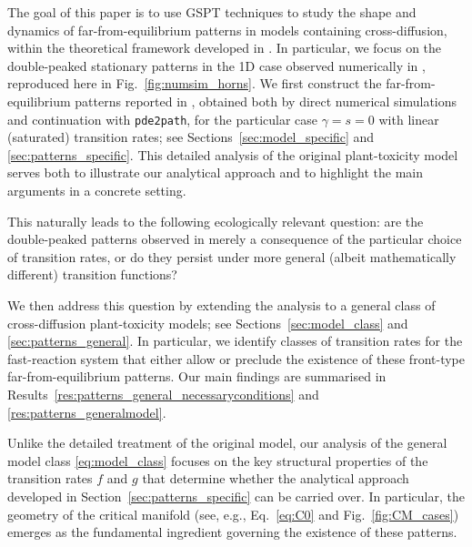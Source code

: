 \documentclass[a4paper,10pt,abstract=true,parskip=true]{scrartcl}
\theoremstyle{remark}
\numberwithin{equation}{section}
\numberwithin{thm}{section}
\begin{document}
The goal of this paper is to use GSPT techniques to study the shape and dynamics of far-from-equilibrium patterns in models containing cross-diffusion, within the theoretical framework developed in \cite{DoelmanVeerman.2015}. In particular, we focus on the double-peaked stationary patterns in the 1D case observed numerically in \cite{GIS_2026}, reproduced here in Fig.~\ref{fig:numsim_horns}. We first construct the far-from-equilibrium patterns reported in \cite{GIS_2026}, obtained both by direct numerical simulations and continuation with \texttt{pde2path}, for the particular case $\gamma=s=0$ with linear (saturated) transition rates; see Sections~\ref{sec:model_specific} and \ref{sec:patterns_specific}. This detailed analysis of the original plant-toxicity model serves both to illustrate our analytical approach and to highlight the main arguments in a concrete setting.

This naturally leads to the following ecologically relevant question: are the double-peaked patterns observed in \cite{GIS_2026} merely a consequence of the particular choice of transition rates, or do they persist under more general (albeit mathematically different) transition functions?

We then address this question by extending the analysis to a general class of cross-diffusion plant-toxicity models; see Sections~\ref{sec:model_class} and \ref{sec:patterns_general}. In particular, we identify classes of transition rates for the fast-reaction system that either allow or preclude the existence of these front-type far-from-equilibrium patterns. Our main findings are summarised in Results~\ref{res:patterns_general_necessaryconditions} and \ref{res:patterns_generalmodel}.

Unlike the detailed treatment of the original model, our analysis of the general model class \eqref{eq:model_class} focuses on the key structural properties of the transition rates $f$ and $g$ that determine whether the analytical approach developed in Section~\ref{sec:patterns_specific} can be carried over. In particular, the geometry of the critical manifold (see, e.g., Eq.~\eqref{eq:C0} and Fig.~\ref{fig:CM_cases}) emerges as the fundamental ingredient governing the existence of these patterns.
\end{document}
